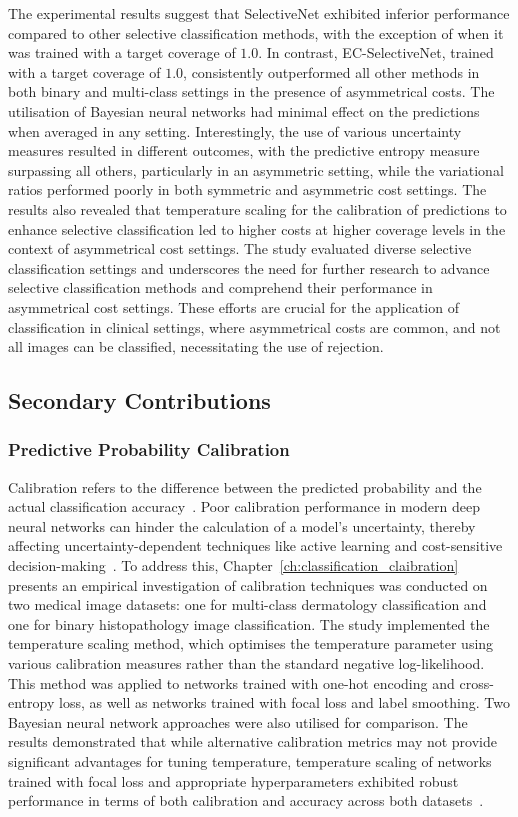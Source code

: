 The experimental results suggest that SelectiveNet exhibited inferior performance compared to other selective classification methods, with the exception of when it was trained with a target coverage of $1.0$. In contrast, EC-SelectiveNet, trained with a target coverage of $1.0$, consistently outperformed all other methods in both binary and multi-class settings in the presence of asymmetrical costs. The utilisation of Bayesian neural networks had minimal effect on the predictions when averaged in any setting. Interestingly, the use of various uncertainty measures resulted in different outcomes, with the predictive entropy measure surpassing all others, particularly in an asymmetric setting, while the variational ratios performed poorly in both symmetric and asymmetric cost settings. The results also revealed that temperature scaling for the calibration of predictions to enhance selective classification led to higher costs at higher coverage levels in the context of asymmetrical cost settings. The study evaluated diverse selective classification settings and underscores the need for further research to advance selective classification methods and comprehend their performance in asymmetrical cost settings. These efforts are crucial for the application of classification in clinical settings, where asymmetrical costs are common, and not all images can be classified, necessitating the use of rejection.

\subsection{Secondary Contributions}
\subsubsection{Predictive Probability Calibration}
Calibration refers to the difference between the predicted probability and the actual classification accuracy~\citep{guo2017calibration}. Poor calibration performance in modern deep neural networks can hinder the calculation of a model's uncertainty, thereby affecting uncertainty-dependent techniques like active learning and cost-sensitive decision-making~\citep{carse2021robust}. To address this, Chapter~\ref{ch:classification_claibration} presents an empirical investigation of calibration techniques was conducted on two medical image datasets: one for multi-class dermatology classification and one for binary histopathology image classification. The study implemented the temperature scaling method, which optimises the temperature parameter using various calibration measures rather than the standard negative log-likelihood. This method was applied to networks trained with one-hot encoding and cross-entropy loss, as well as networks trained with focal loss and label smoothing. Two Bayesian neural network approaches were also utilised for comparison. The results demonstrated that while alternative calibration metrics may not provide significant advantages for tuning temperature, temperature scaling of networks trained with focal loss and appropriate hyperparameters exhibited robust performance in terms of both calibration and accuracy across both datasets~\citep{carse2022calibration}.

